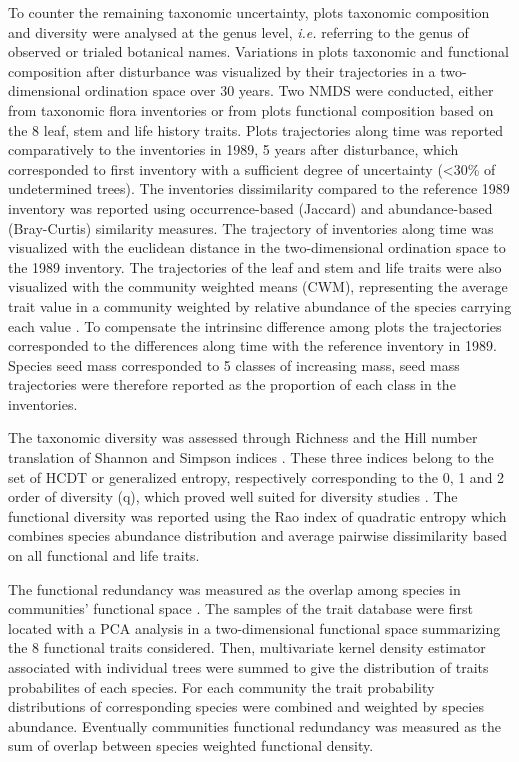\documentclass[fleqn,10pt]{ArtEcoFoG} %
\theoremstyle{definition}
\theoremstyle{definition}
\theoremstyle{definition}
\theoremstyle{remark}
\begin{document}
To counter the remaining taxonomic uncertainty, plots taxonomic
composition and diversity were analysed at the genus level, \emph{i.e.}
referring to the genus of observed or trialed botanical names.
Variations in plots taxonomic and functional composition after
disturbance was visualized by their trajectories in a two-dimensional
ordination space over 30 years. Two NMDS were conducted, either from
taxonomic flora inventories or from plots functional composition based
on the 8 leaf, stem and life history traits. Plots trajectories along
time was reported comparatively to the inventories in 1989, 5 years
after disturbance, which corresponded to first inventory with a
sufficient degree of uncertainty (\textless{}30\% of undetermined
trees). The inventories dissimilarity compared to the reference 1989
inventory was reported using occurrence-based (Jaccard) and
abundance-based (Bray-Curtis) similarity measures. The trajectory of
inventories along time was visualized with the euclidean distance in the
two-dimensional ordination space to the 1989 inventory. The trajectories
of the leaf and stem and life traits were also visualized with the
community weighted means (CWM), representing the average trait value in
a community weighted by relative abundance of the species carrying each
value \citep{Diaz2007, Garnier2004}. To compensate the intrinsinc
difference among plots the trajectories corresponded to the differences
along time with the reference inventory in 1989. Species seed mass
corresponded to 5 classes of increasing mass, seed mass trajectories
were therefore reported as the proportion of each class in the
inventories.

The taxonomic diversity was assessed through Richness and the Hill
number translation of Shannon and Simpson indices \citep{Hill1973}.
These three indices belong to the set of HCDT or generalized entropy,
respectively corresponding to the 0, 1 and 2 order of diversity (q),
which proved well suited for diversity studies
\citep{Patil1982, Tothmeresz1995}. The functional diversity was reported
using the Rao index of quadratic entropy which combines species
abundance distribution and average pairwise dissimilarity based on all
functional and life traits.

The functional redundancy was measured as the overlap among species in
communities' functional space \citep{Carmona2016}. The samples of the
trait database were first located with a PCA analysis in a
two-dimensional functional space summarizing the 8 functional traits
considered. Then, multivariate kernel density estimator associated with
individual trees were summed to give the distribution of traits
probabilites of each species. For each community the trait probability
distributions of corresponding species were combined and weighted by
species abundance. Eventually communities functional redundancy was
measured as the sum of overlap between species weighted functional
density.
\end{document}
